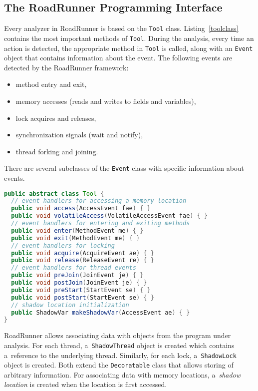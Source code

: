 \subsection{The RoadRunner Programming Interface}

Every analyzer in RoadRunner is based on the \texttt{Tool} class.
Listing~\ref{toolclass} contains the most important methods of \texttt{Tool}.
During the analysis, every time an action is detected, the appropriate method in
\texttt{Tool} is called, along with an \texttt{Event} object that contains
information about the event. The following events are detected by the RoadRunner
framework:
\begin{itemize}
    \item method entry and exit,
    \item memory accesses (reads and writes to fields and variables),
    \item lock acquires and releases,
    \item synchronization signals (wait and notify),
    \item thread forking and joining.
\end{itemize}
There are several subclasses of the \texttt{Event} class with specific
information about events.

\begin{lstlisting}[language=java, label=toolclass, float=hbt, caption={The
abstract class \texttt{Tool}. Only selected public methods are shown.}]
public abstract class Tool {
  // event handlers for accessing a memory location
  public void access(AccessEvent fae) { }
  public void volatileAccess(VolatileAccessEvent fae) { }
  // event handlers for entering and exiting methods
  public void enter(MethodEvent me) { }
  public void exit(MethodEvent me) { }
  // event handlers for locking
  public void acquire(AcquireEvent ae) { }
  public void release(ReleaseEvent re) { }
  // event handlers for thread events
  public void preJoin(JoinEvent je) { }
  public void postJoin(JoinEvent je) { }
  public void preStart(StartEvent se) { }
  public void postStart(StartEvent se) { }
  // shadow location initialization
  public ShadowVar makeShadowVar(AccessEvent ae) { }
}
\end{lstlisting}

RoadRunner allows associating data with objects from the program under analysis.
For each thread, a~\texttt{ShadowThread} object is created which contains
a~reference to the underlying thread. Similarly, for each lock,
a~\texttt{ShadowLock} object is created. Both extend the \texttt{Decoratable}
class that allows storing of arbitrary information. For associating data with
memory locations, a~\emph{shadow location} is created when the location is first
accessed.

